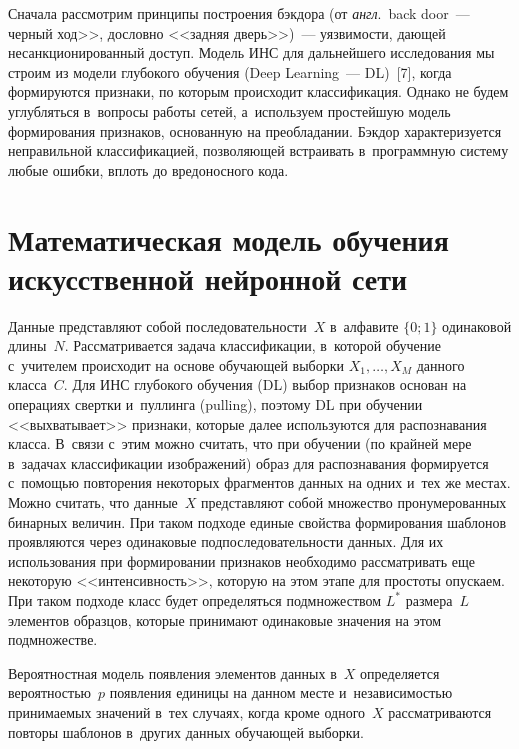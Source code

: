 \begin{multicols}{2}
  Сначала рассмотрим принципы построения бэкдора (от \textit{англ}.\ back door~--- 
черный ход>>, дословно <<задняя дверь>>)~--- уязвимости, да\-ющей 
несанкционированный доступ. Модель ИНС для дальнейшего исследования мы 
строим из модели глубокого обуче\-ния (Deep Learning~--- DL)~[7], когда 
формируются признаки, по которым происходит классификация. Однако не будем 
углубляться в~вопросы работы сетей, а~используем простейшую модель 
формирования признаков, основанную на преобладании. Бэкдор характеризуется 
неправильной классификацией, позволяющей встраивать в~программную систему 
любые ошибки, вплоть до вредоносного кода.

\vspace*{-6pt}
  
  \section{Математическая модель обучения искусственной нейронной сети}
  
  \vspace*{-3pt}
  
  Данные представляют собой последовательности~$X$ в~алфавите $\{0; 1\}$ 
одинаковой длины~$N$. Рассматривается задача классификации, в~которой 
обучение с~учителем происходит на основе обуча\-ющей выборки $X_1, \ldots , 
X_M$ данного класса~$C$. Для ИНС глубокого обучения (DL) выбор признаков 
основан на операциях свертки и~пуллинга (pulling), поэтому DL при обучении 
<<выхватывает>> признаки, которые далее используются для распознавания 
класса. В~связи с~этим мож\-но считать, что при обуче\-нии (по крайней мере 
в~задачах классификации изображений) образ для распознавания формируется 
с~по\-мощью повторения некоторых фрагментов данных на одних и~тех же 
местах. Можно считать, что данные~$X$ пред\-став\-ля\-ют собой множество 
пронумерованных бинарных величин. При таком подходе единые свойства 
формирования шаблонов проявляются через одинаковые подпоследовательности 
данных. Для их использования при формировании при\-зна\-ков необходимо 
рассматривать еще некоторую <<ин\-тен\-сив\-ность>>, которую на этом этапе для 
простоты опускаем. При таком подходе класс будет определяться подмножеством 
$L^*$ размера~$L$ элементов образцов, которые принимают одинаковые 
значения на этом подмножестве.
  
  Вероятностная модель появления элементов данных в~$X$ определяется 
вероятностью~$p$ появления единицы на данном месте и~не\-за\-ви\-си\-мостью 
принимаемых значений в~тех случаях, когда кроме одного~$X$ рассматриваются 
повторы шаблонов в~других данных обуча\-ющей выборки.
  

\end{multicols}
